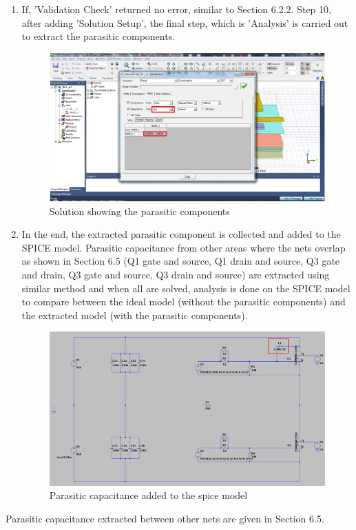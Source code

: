 \begin{enumerate}
\item If, 'Validation Check' returned no error, similar to Section 6.2.2. Step 10, after adding 'Solution Setup', the final step, which is 'Analysis' is carried out to extract the parasitic components.

\begin{figure} [H]
  \centering
  \includegraphics[width=\linewidth]{pictures/examples/results2.png}
  \caption{Solution showing the parasitic components}
  \label{fig:results2}
\end{figure}

\item In the end, the extracted parasitic component is collected and added to the SPICE model. Parasitic capacitance from other areas where the nets overlap as shown in Section 6.5 (Q1 gate and source, Q1 drain and source, Q3 gate and drain, Q3 gate and source, Q3 drain and source) are extracted using similar method and when all are solved, analysis is done on the SPICE model to compare between the ideal model (without the parasitic components) and the extracted model (with the parasitic components).

\begin{figure} [H]
  \centering
  \includegraphics[width=\linewidth]{pictures/examples/spice6.png}
  \caption{Parasitic capacitance added to the spice model}
  \label{fig:results2}
\end{figure}

\end{enumerate}

Parasitic capacitance extracted between other nets are given in Section 6.5.